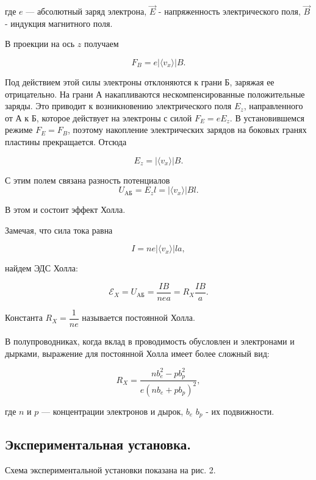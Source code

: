 \documentclass[a4paper]{article}
\theoremstyle{definition}
\theoremstyle{remark}
\begin{document}
	где $e$ --- абсолютный заряд электрона, $\vec{E}$ - напряженность электрического поля, $\vec{B}$ - индукция магнитного поля.
	
	В проекции на ось $z$ получаем
	
	$$ F_{B}=e | \langle {v_{x}} \rangle | B.$$
	
	Под действием этой силы электроны отклоняются к грани Б, заряжая ее отрицательно. На грани А накапливаются нескомпенсированные положительные заряды. Это приводит к возникновению электрического поля $E_{z}$, направленного от А к Б, которое действует на электроны с силой $F_{E}=eE_{z}$. В установившемся режиме $F_{E}=F_{B}$, поэтому накопление электрических зарядов на боковых гранях пластины прекращается. Отсюда
	
	$$ E_{z}=| \langle {v_{x}} \rangle | B.$$
	
	С этим полем связана разность потенциалов $$U_{\text{AБ}}=E_{z}l=| \langle {v_{x}} \rangle | Bl.$$
	
	В этом и состоит эффект Холла. \medskip
	
	Замечая, что сила тока равна
	
	$$ I=ne| \langle {v_{x}} \rangle |la,$$
	
	найдем ЭДС Холла:
	
\begin{equation*}\label{Rx}
	\mathscr{E}_{X}=U_{\text{AБ}}=\dfrac{IB}{nea}=R_{X}\dfrac{IB}{a}.
\end{equation*}
	
	Константа $R_{X}=\dfrac{1}{ne}$ называется постоянной Холла. \medskip
	
	В полупроводниках, когда вклад в проводимость обусловлен и электронами и дырками, выражение для постоянной Холла имеет более сложный вид:
	
	$$R_{X}=\dfrac{nb^{2}_{e}-pb^{2}_{p}}{e(nb_{e}+pb_{p})^{2}},$$
	
	где $n$ и $p$ --- концентрации электронов и дырок, $b_{e}$ $b_{p}$ - их подвижности.
	
	\subsection{Экспериментальная установка.}
	Схема экспериментальной установки показана на рис. 2.
	
\end{document}
